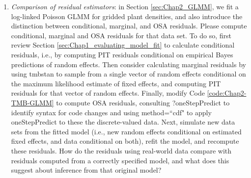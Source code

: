 \begin{enumerate}
    \item \textit{Comparison of residual estimators}:  in Section \ref{sec:Chap2_GLMM}, we fit a log-linked Poisson GLMM for gridded plant densities, and also introduce the distinction between conditional, marginal, and OSA residuals.  Please compute conditional, marginal and OSA residuals for that data set.  To do so, first review Section \ref{sec:Chap1_evaluating_model_fit} to calculate conditional residuals, i.e., by computing PIT residuals conditional on empirical Bayes predictions of random effects. Then consider calculating marginal residuals by using \colorbox{backcolour}{tmbstan} to sample from a single vector of random effects conditional on the maximum likelihood estimate of fixed effects, and computing PIT residuals for that vector of random effects.  Finally, modify Code \ref{code:Chap2-TMB-GLMM} to compute OSA residuals, consulting \colorbox{backcolour}{?oneStepPredict} to identify syntax for code changes and using \colorbox{backcolour}{method=``cdf"} to apply \colorbox{backcolour}{oneStepPredict} to these the discrete-valued data.  Next, simulate new data sets from the fitted model (i.e., new random effects conditional on estimated fixed effects, and data conditional on both), refit the model, and recompute these residuals.  How do the residuals using real-world data compare with residuals computed from a correctly specified model, and what does this suggest about inference from that original model?   
\end{enumerate}
 
     


